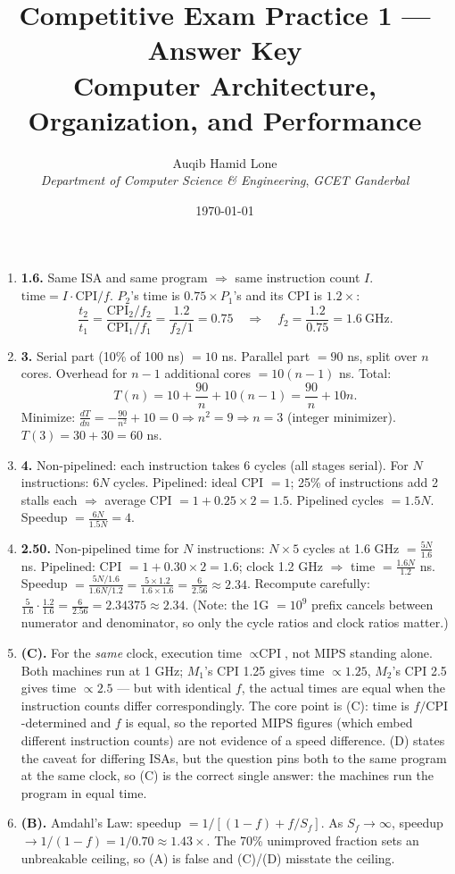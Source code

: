 \documentclass[11pt]{article}
\title{Competitive Exam Practice 1 --- Answer Key\\\large Computer Architecture, Organization, and Performance}
\author{Auqib Hamid Lone\\[0.3em]
  \emph{Department of Computer Science \& Engineering}, \emph{GCET Ganderbal}}
\date{\today}
\begin{document}
\maketitle

\begin{enumerate}
\item[\textbf{Q1}] \textbf{1.6.} Same ISA and same program $\Rightarrow$ same instruction count $I$. $\text{time} = I \cdot \text{CPI}/f$. $P_2$'s time is $0.75\times P_1$'s and its CPI is $1.2\times$:
\[
  \frac{t_2}{t_1} = \frac{\text{CPI}_2/f_2}{\text{CPI}_1/f_1} =
  \frac{1.2}{f_2/1} = 0.75 \quad\Rightarrow\quad f_2 = \frac{1.2}{0.75} = 1.6\ \text{GHz}.
\]

\item[\textbf{Q2}] \textbf{3.} Serial part (10\% of 100 ns) $= 10$ ns. Parallel part $= 90$ ns, split over $n$ cores. Overhead for $n-1$ additional cores $= 10(n-1)$ ns. Total:
\[
  T(n) = 10 + \frac{90}{n} + 10(n-1) = \frac{90}{n} + 10n.
\]
Minimize: $\frac{dT}{dn} = -\frac{90}{n^2} + 10 = 0 \Rightarrow n^2 = 9 \Rightarrow n = 3$ (integer minimizer). $T(3) = 30 + 30 = 60$ ns.

\item[\textbf{Q3}] \textbf{4.} Non-pipelined: each instruction takes 6 cycles (all stages serial). For $N$ instructions: $6N$ cycles. Pipelined: ideal CPI $= 1$; 25\% of instructions add 2 stalls each $\Rightarrow$ average CPI $= 1 + 0.25 \times 2 = 1.5$. Pipelined cycles $= 1.5N$. Speedup $= \frac{6N}{1.5N} = 4$.

\item[\textbf{Q4}] \textbf{2.50.} Non-pipelined time for $N$ instructions: $N \times 5$ cycles at 1.6 GHz $= \frac{5N}{1.6}$ ns. Pipelined: CPI $= 1 + 0.30 \times 2 = 1.6$; clock 1.2 GHz $\Rightarrow$ time $= \frac{1.6N}{1.2}$ ns. Speedup $= \frac{5N/1.6}{1.6N/1.2} = \frac{5 \times 1.2}{1.6 \times 1.6} = \frac{6}{2.56} \approx 2.34$. Recompute carefully: $\frac{5}{1.6} \cdot \frac{1.2}{1.6} = \frac{6}{2.56} = 2.34375 \approx \mathbf{2.34}$. (Note: the 1G $= 10^9$ prefix cancels between numerator and denominator, so only the cycle ratios and clock ratios matter.)

\item[\textbf{Q5}] \textbf{(C).} For the \emph{same} clock, execution time $\propto \text{CPI}$, not MIPS standing alone. Both machines run at 1 GHz; $M_1$'s CPI 1.25 gives time $\propto 1.25$, $M_2$'s CPI 2.5 gives time $\propto 2.5$ --- but with identical $f$, the actual times are equal when the instruction counts differ correspondingly. The core point is (C): time is $f/\text{CPI}$-determined and $f$ is equal, so the reported MIPS figures (which embed different instruction counts) are not evidence of a speed difference. (D) states the caveat for differing ISAs, but the question pins both to the same program at the same clock, so (C) is the correct single answer: the machines run the program in equal time.

\item[\textbf{Q6}] \textbf{(B).} Amdahl's Law: speedup $= 1\big/[(1-f) + f/S_f]$. As $S_f \to \infty$, speedup $\to 1/(1-f) = 1/0.70 \approx 1.43\times$. The 70\% unimproved fraction sets an unbreakable ceiling, so (A) is false and (C)/(D) misstate the ceiling.
\end{enumerate}
\end{document}
